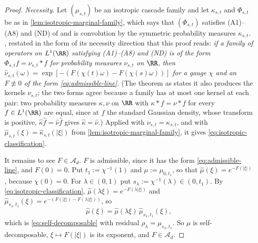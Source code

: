 \begin{proof}
\leanok
\emph{Necessity.} Let $(\mu_{s,t})$ be an isotropic cascade family and let $\kappa_{s,t}$ and
$\Phi_{s,t}$ be as in \ref{lem:isotropic-marginal-family}, which says that $(\Phi_{s,t})$
satisfies (A1)--(A8) and (ND) of  and is convolution by the symmetric probability
measures $\kappa_{s,t}$. , restated in the form of its necessity direction that this
proof reads: \emph{if a family of operators on $L^1(\RR)$ satisfying (A1)--(A8) and (ND) is of the
form $\Phi_{s,t}f = \nu_{s,t} * f$ for probability measures $\nu_{s,t}$ on $\RR$, then
$\widehat\nu_{s,t}(\omega) = \exp[-(F(\chi(t)\omega) - F(\chi(s)\omega))]$ for a gauge $\chi$ and
an $F \not\equiv 0$ of the form \ref{eq:admissible-line}.} (The theorem as  states it also
produces the kernels $\nu_{s,t}$; the two forms agree because a family has at most one kernel at
each pair: two probability measures $\kappa, \nu$ on $\RR$ with $\kappa * f = \nu * f$ for every
$f \in L^1(\RR)$ are equal, since at $f$ the standard Gaussian density, whose transform is
positive, $\widehat\kappa\widehat f = \widehat\nu\widehat f$ gives $\widehat\kappa = \widehat\nu$.)
Applied with $\nu_{s,t} = \kappa_{s,t}$, and with $\widehat\mu_{s,t}(\xi) =
\widehat\kappa_{s,t}(|\xi|)$ from \ref{lem:isotropic-marginal-family}, it gives
\ref{eq:isotropic-classification}.

It remains to see $F \in \mathcal{A}_d$. $F$ is admissible, since it has the form
\ref{eq:admissible-line}, and $F(0) = 0$. Put $t_1 := \chi^{-1}(1)$ and $\mu := \mu_{0,t_1}$, so
that $\widehat\mu(\xi) = e^{-F(|\xi|)}$, because $\chi(0) = 0$. For $\lambda \in (0,1)$ put
$s_\lambda := \chi^{-1}(\lambda) \in (0,t_1)$. By \ref{eq:isotropic-classification},
$\widehat\mu(\lambda\xi) = e^{-F(\lambda|\xi|)}$ and
$\widehat\mu_{s_\lambda,t_1}(\xi) = e^{-(F(|\xi|) - F(\lambda|\xi|))}$, so
\[
  \widehat\mu(\xi) = \widehat\mu(\lambda\xi)\,\widehat\mu_{s_\lambda,t_1}(\xi) ,
\]
which is \ref{eq:self-decomposable} with residual $\rho_\lambda = \mu_{s_\lambda,t_1}$. So $\mu$ is
self-decomposable, $\xi \mapsto F(|\xi|)$ is its exponent, and $F \in \mathcal{A}_d$.


\end{proof}
